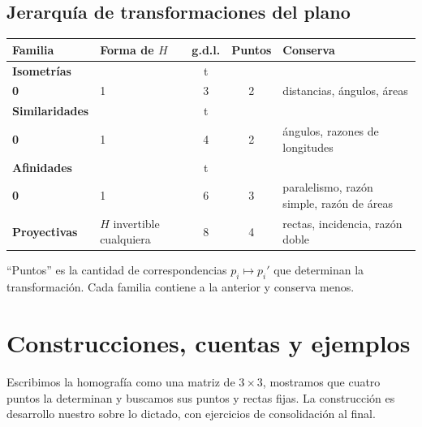 \subsection{Jerarquía de transformaciones del plano}\label{sec:jerarquia}

\begin{center}
\begin{tabularx}{\textwidth}{>{\bfseries}p{24mm} p{44mm} c c X}
\toprule
Familia & Forma de \(H\) & g.d.l. & Puntos & Conserva\\
\midrule
Isometrías & \(\begin{pmatrix}R&t\\0&1\end{pmatrix}\), \(R^TR=I\) & 3 & 2 &
distancias, ángulos, áreas\\
Similaridades & \(\begin{pmatrix}kR&t\\0&1\end{pmatrix}\) & 4 & 2 &
ángulos, razones de longitudes\\
Afinidades & \(\begin{pmatrix}A&t\\0&1\end{pmatrix}\), \(\det A\neq0\) & 6 & 3 &
paralelismo, razón simple, razón de áreas\\
Proyectivas & \(H\) invertible cualquiera & 8 & 4 &
rectas, incidencia, razón doble\\
\bottomrule
\end{tabularx}
\end{center}
``Puntos'' es la cantidad de correspondencias \(p_i\mapsto p_i'\) que determinan la
transformación. Cada familia contiene a la anterior y conserva menos.

\section{Construcciones, cuentas y ejemplos}

Escribimos la homografía como una matriz de \(3\times3\), mostramos que cuatro puntos la determinan y buscamos sus puntos y rectas fijas. La construcción es desarrollo nuestro sobre lo dictado, con ejercicios de consolidación al final.

{\small\vspace{1mm}\par}
{\small\vspace{1mm}\par}

